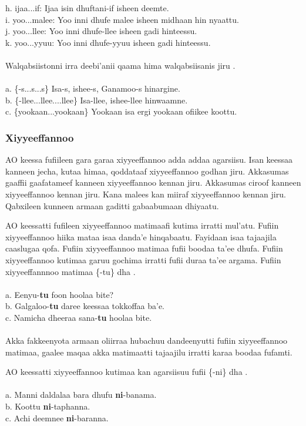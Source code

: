 \documentclass[11pt,b5paper]{book}
\begin{document}
h. ijaa...if: Ijaa isin dhuftani-if isheen deemte.\\
i. yoo...malee: Yoo inni dhufe malee isheen midhaan hin nyaattu.\\
j. yoo...llee: Yoo inni dhufe-llee isheen gadi hinteessu.\\
k. yoo...yyuu: Yoo inni dhufe-yyuu isheen gadi hinteessu. \\
\\
Walqabsiistonni irra deebi’anii qaama hima walqabsiisanis jiru \cite{griefenow2001grammatical}.\\
\\
a. \{-s...s...s\} Isa-s, ishee-s, Ganamoo-s hinargine.\\
b. \{-llee...llee....llee\} Isa-llee, ishee-llee hinwaamne.\\
c. \{yookaan...yookaan\} Yookaan isa ergi yookaan ofiikee koottu.

\subsubsection{Xiyyeeffannoo}

AO keessa fufiileen gara garaa xiyyeeffannoo adda addaa agarsiisu. Isan keessaa kanneen jecha, kutaa himaa, qoddataaf xiyyeeffannoo godhan jiru. Akkasumas gaaffii gaafatameef kanneen xiyyeeffannoo kennan jiru. Akkasumas ciroof kanneen xiyyeeffannoo kennan jiru. Kana malees kan miiraf xiyyeeffannoo kennan jiru. Qabxileen kunneen armaan gaditti gabaabumaan dhiyaatu.

AO keessatti fufileen xiyyeeffannoo matimaafi kutima irratti mul’atu. Fufiin xiyyeeffannoo hiika mataa isaa danda’e
hinqabaatu. Fayidaan isaa tajaajila caaslugaa qofa. Fufiin xiyyeeffannoo matimaa fufii boodaa ta’ee dhufa. Fufiin
xiyyeeffannoo kutimaa garuu gochima irratti fufii duraa ta’ee argama. Fufiin xiyyeeffannnoo matimaa \{-tu\} dha \cite[p.371]{baye1988focus}.\\
\\
a. Eenyu-\textbf{tu} foon hoolaa bite?\\
b. Galgaloo-\textbf{tu} daree keessaa tokkoffaa ba’e.\\
c. Namicha dheeraa sana-\textbf{tu} hoolaa bite. \\
\\
Akka fakkeenyota armaan oliirraa hubachuu dandeenyutti fufiin xiyyeeffannoo matimaa, gaalee maqaa akka matimaatti
tajaajilu irratti karaa boodaa fufamti. 


AO keessatti xiyyeeffannoo kutimaa kan agarsiisuu fufii \{-ni\} dha \cite[p.54]{griefenow2001grammatical}. \\
\\
a. Manni daldalaa bara dhufu \textbf{ni}-banama.\\
b. Koottu \textbf{ni}-taphanna.\\
c. Achi deemnee \textbf{ni}-baranna.\\
\end{document}
